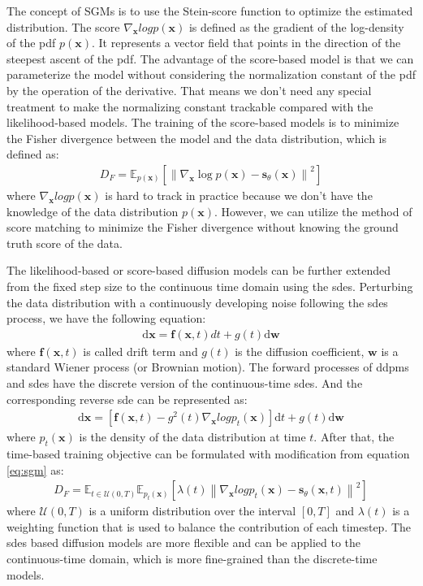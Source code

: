 \documentclass[12pt,DIV14,BCOR12mm,a4paper,footinclude=false,headinclude,parskip=half-,twoside,openright,cleardoublepage=empty,toc=index,bibliography=totoc,listof=totoc]{scrreprt}
\numberwithin{equation}{chapter}
\begin{document}
The concept of SGMs is to use the Stein-score function to optimize the estimated distribution. The score $\nabla_{\mathbf{x}}log p(\mathbf{x})$ is defined as the gradient of the log-density of the \gls{pdf} $p(\mathbf{x})$. It represents a vector field that points in the direction of the steepest ascent of the \gls{pdf}. The advantage of the score-based model is that we can parameterize the model without considering the normalization constant of the \gls{pdf} by the operation of the derivative. That means we don't need any special treatment to make the normalizing constant trackable compared with the likelihood-based models. The training of the score-based models is to minimize the Fisher divergence between the model and the data distribution, which is defined as:
\begin{align}\label{eq:sgm}
  D_{F} = \mathbb{E}_{p(\mathbf{x})}\left[\left\lVert\nabla_{\mathbf{x}}\log p(\mathbf{x}) - \mathbf{s}_{\theta}(\mathbf{x})\right\rVert^{2}\right]
\end{align}
where $\nabla_{\mathbf{x}}log p(\mathbf{x})$ is hard to track in practice because we don't have the knowledge of the data distribution $p(\mathbf{x})$. However, we can utilize the method of score matching \cite{10.5555/1046920.1088696,6795935} to minimize the Fisher divergence without knowing the ground truth score of the data.

The likelihood-based or score-based diffusion models can be further extended from the fixed step size to the continuous time domain using the \glspl{sde}. Perturbing the data distribution with a continuously developing noise following the \glspl{sde} process, we have the following equation:
\begin{align}
  \text{d}\mathbf{x}=\mathbf{f}(\mathbf{x},t)dt + g(t)\text{d}\mathbf{w}
\end{align}
where $\mathbf{f}(\mathbf{x},t)$ is called drift term and $g(t)$ is the diffusion coefficient, $\mathbf{w}$ is a standard Wiener process (or Brownian motion). The forward processes of \glspl{ddpm} and \glspl{sde} have the discrete version of the continuous-time \glspl{sde}. And the corresponding reverse \gls{sde} can be represented as:
\begin{align}
  \text{d}\mathbf{x}=\left[\mathbf{f}(\mathbf{x},t)-g^{2}(t)\nabla_{\mathbf{x}}log p_{t}(\mathbf{x})\right]\text{d}t + g(t)\text{d}\mathbf{w}
\end{align}
where $p_{t}(\mathbf{x})$ is the density of the data distribution at time $t$. After that, the time-based training objective can be formulated with modification from equation \ref{eq:sgm} as:
\begin{align}
  D_{F} = \mathbb{E}_{t\in \mathcal{U}(0,T)} \mathbb{E}_{p_{t}(\mathbf{x})}\left[\lambda(t)\left\lVert\nabla_{\mathbf{x}}log p_{t}(\mathbf{x}) - \mathbf{s}_{\theta}(\mathbf{x},t)\right\rVert^{2}\right]
\end{align}
where $\mathcal{U}(0,T)$ is a uniform distribution over the interval $[0,T]$ and $\lambda(t)$ is a weighting function that is used to balance the contribution of each timestep. The \glspl{sde} based diffusion models are more flexible and can be applied to the continuous-time domain, which is more fine-grained than the discrete-time models.
\end{document}
